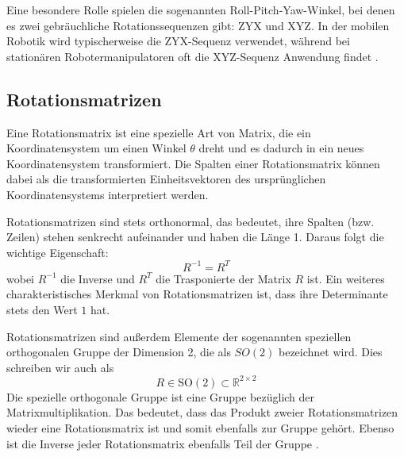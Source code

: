 Eine besondere Rolle spielen die sogenannten Roll-Pitch-Yaw-Winkel, bei denen es zwei gebräuchliche Rotationssequenzen gibt: ZYX und XYZ.
In der mobilen Robotik wird typischerweise die ZYX-Sequenz verwendet,
während bei stationären Robotermanipulatoren oft die XYZ-Sequenz Anwendung findet .

\subsection{Rotationsmatrizen}
Eine Rotationsmatrix ist eine spezielle Art von Matrix, die ein Koordinatensystem um einen Winkel $\theta$ dreht und es dadurch in ein neues Koordinatensystem transformiert.
Die Spalten einer Rotationsmatrix können dabei als die transformierten Einheitsvektoren des ursprünglichen Koordinatensystems interpretiert werden.

Rotationsmatrizen sind stets orthonormal, das bedeutet, ihre Spalten (bzw. Zeilen) stehen senkrecht aufeinander und haben die Länge 1.
Daraus folgt die wichtige Eigenschaft:
\[
 R^{-1}=R^T
 \]
wobei $R^{-1}$ die Inverse und $R^T$ die Trasponierte der Matrix $R$ ist.
Ein weiteres charakteristisches Merkmal von Rotationsmatrizen ist, dass ihre Determinante stets den Wert $1$ hat.

Rotationsmatrizen sind außerdem Elemente der sogenannten speziellen orthogonalen Gruppe der Dimension 2, die als $SO(2)$ bezeichnet wird. Dies schreiben wir auch als
\[
    R \in \mathrm{SO}(2) \subset \mathbb{R}^{2 \times 2}
\]
Die spezielle orthogonale Gruppe ist eine Gruppe bezüglich der Matrixmultiplikation.
Das bedeutet, dass das Produkt zweier Rotationsmatrizen wieder eine Rotationsmatrix ist und somit ebenfalls zur Gruppe gehört.
Ebenso ist die Inverse jeder Rotationsmatrix ebenfalls Teil der Gruppe .

